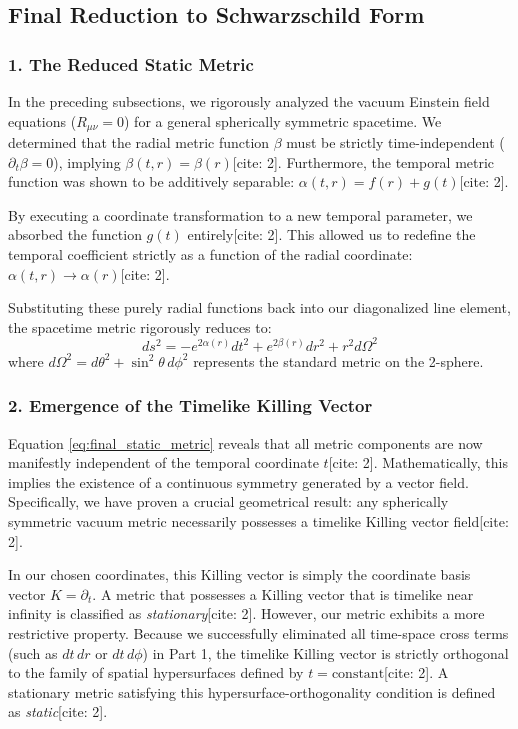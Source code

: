\documentclass[11pt, a4paper]{report}
\begin{document}
\subsection*{Final Reduction to Schwarzschild Form}

\subsubsection*{1. The Reduced Static Metric}

In the preceding subsections, we rigorously analyzed the vacuum Einstein field equations ($R_{\mu\nu} = 0$) for a general spherically symmetric spacetime. We determined that the radial metric function $\beta$ must be strictly time-independent ($\partial_t \beta = 0$), implying $\beta(t,r) = \beta(r)$[cite: 2]. Furthermore, the temporal metric function was shown to be additively separable: $\alpha(t,r) = f(r) + g(t)$[cite: 2]. 

By executing a coordinate transformation to a new temporal parameter, we absorbed the function $g(t)$ entirely[cite: 2]. This allowed us to redefine the temporal coefficient strictly as a function of the radial coordinate: $\alpha(t,r) \to \alpha(r)$[cite: 2]. 

Substituting these purely radial functions back into our diagonalized line element, the spacetime metric rigorously reduces to:
\begin{equation}
    ds^2 = -e^{2\alpha(r)} dt^2 + e^{2\beta(r)} dr^2 + r^2 d\Omega^2 \label{eq:final_static_metric}
\end{equation}
where $d\Omega^2 = d\theta^2 + \sin^2\theta \, d\phi^2$ represents the standard metric on the 2-sphere.

\subsubsection*{2. Emergence of the Timelike Killing Vector}

Equation \eqref{eq:final_static_metric} reveals that all metric components are now manifestly independent of the temporal coordinate $t$[cite: 2]. Mathematically, this implies the existence of a continuous symmetry generated by a vector field. Specifically, we have proven a crucial geometrical result: any spherically symmetric vacuum metric necessarily possesses a timelike Killing vector field[cite: 2]. 

In our chosen coordinates, this Killing vector is simply the coordinate basis vector $K = \partial_t$. A metric that possesses a Killing vector that is timelike near infinity is classified as \textit{stationary}[cite: 2]. However, our metric exhibits a more restrictive property. Because we successfully eliminated all time-space cross terms (such as $dt \, dr$ or $dt \, d\phi$) in Part 1, the timelike Killing vector is strictly orthogonal to the family of spatial hypersurfaces defined by $t = \text{constant}$[cite: 2]. A stationary metric satisfying this hypersurface-orthogonality condition is defined as \textit{static}[cite: 2]. 
\end{document}
